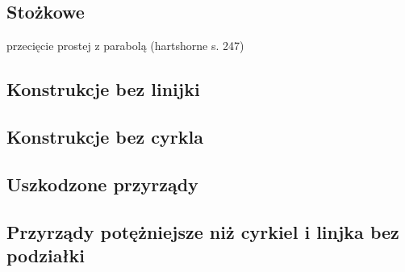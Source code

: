 \subsection{Stożkowe}
przecięcie prostej z parabolą (hartshorne s. 247)


\subsection{Konstrukcje bez linijki}



\subsection{Konstrukcje bez cyrkla}


\subsection{Uszkodzone przyrządy}


\subsection{Przyrządy potężniejsze niż cyrkiel i linjka bez podziałki}

